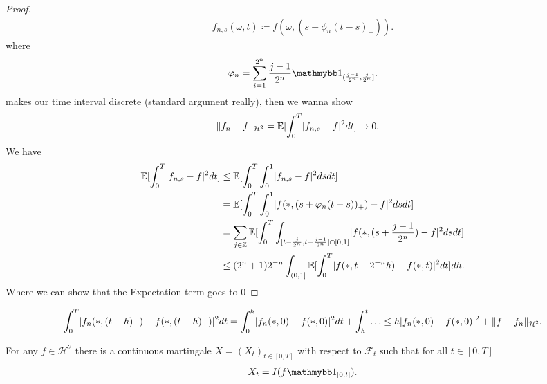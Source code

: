 \begin{proof}
\begin{align*}
  f_{n,s}(\omega ,t) \coloneqq  f(\omega ,(s+\phi_n(t-s)_+))
.\end{align*}
where
\begin{align*}
  \phi_n = \sum_{i=1}^{2^n} \frac{j-1}{2^{n} }\cha_{(\frac{j-1}{2^{n}  },\frac{j}{2^{n} }]}
.\end{align*}
makes our time interval discrete (standard argument really), then we wanna show 
\begin{align*}
  \|f_n-f\|_{\mathcal{H}^2}&= \mathbb{E}[\int_0^{T} \lvert f_{n,s}-f\rvert^2 dt ] \to 0
.\end{align*}
We have 
\begin{align*}
  \mathbb{E}[\int_0^{T} \lvert f_{n,s}-f\rvert^2 dt ] &\le \mathbb{E}[\int_0^{T} \int_0^{1} \lvert f_{n,s}-f\rvert^2 ds dt]\\
                                       &= \mathbb{E}[\int_0^{T} \int_0^{1} \lvert f(*,(s+\varphi_n(t-s))_+)-f\rvert^2 ds dt]\\
                                       &=  \sum_{j\in \mathbb{Z}}\mathbb{E}[\int_0^{T} \int_{[t-\frac{j}{2^{n} },t-\frac{j-1}{2^{n} }] \cap [0,1]} \lvert f(*,(s+\frac{j-1}{2^{n} })-f\rvert^2 ds dt]\\
                                       &\le (2^{n}+1 )2^{-n}  \int_{(0,1]} \mathbb{E}[\int_0^{T}\lvert f(*,t-2^{-n}h )-f(*,t)\rvert^2 dt ]dh 
.\end{align*}
Where we can show that the Expectation term goes to 0
\end{proof}
\begin{align*}
  \int_0^{T}  \lvert f_n(*,(t-h)_+)-f(*,(t-h)_+)\rvert^2 dt = \int_0^{h} \lvert f_n(*,0)-f(*,0)\rvert^2 dt + \int_h^{t} \ldots \le h\lvert f_n(*,0)-f(*,0)\rvert^2 + \|f-f_n\|_{\mathcal{H}^2}
.\end{align*}
\begin{Theorem}[3.7.]
  For any $f \in  \mathcal{H}^2$ there is a continuous martingale $X = (X_t)_{t \in  [0,T]}$ with 
  respect to $\mathcal{F}_t$ such that for all $t \in  [0,T]$
  \begin{align*}
    X_t = I(f \cha_{[0,t]})
  .\end{align*} 
\end{Theorem}
